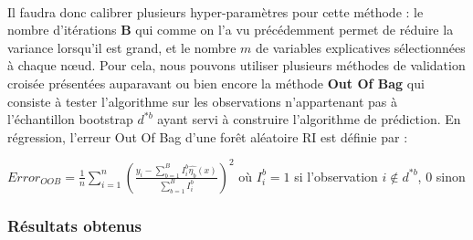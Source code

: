 \documentclass[14pt, openany]{article}
\begin{document}
\paragraph{}
Il faudra donc calibrer plusieurs hyper-paramètres pour cette méthode : le nombre d'itérations \textbf{B} qui comme on l'a vu précédemment permet de réduire la variance lorsqu'il est grand, et le nombre $m$ de variables explicatives sélectionnées à chaque nœud. Pour cela, nous pouvons utiliser plusieurs méthodes de validation croisée présentées auparavant ou bien encore la méthode \textbf{Out Of Bag} qui consiste à tester l'algorithme sur les observations n'appartenant pas à l'échantillon bootstrap $d^{*b}$ ayant servi à construire l'algorithme de prédiction. En régression, l'erreur Out Of Bag d'une forêt aléatoire RI est définie par :
\begin{center}
$Error_{OOB}=\frac{1}{n}\sum\limits_{i=1}^n (\frac{y_i-\sum\limits_{b=1}^B I_{i}^{b}\hat{\eta_b}(x)}{\sum\limits_{b=1}^B I_{i}^{b}})^2$ où $I_{i}^{b}=1$ si l'observation $i \notin d^{*b}$, 0 sinon
\end{center}
\subsubsection{Résultats obtenus}
\end{document}
